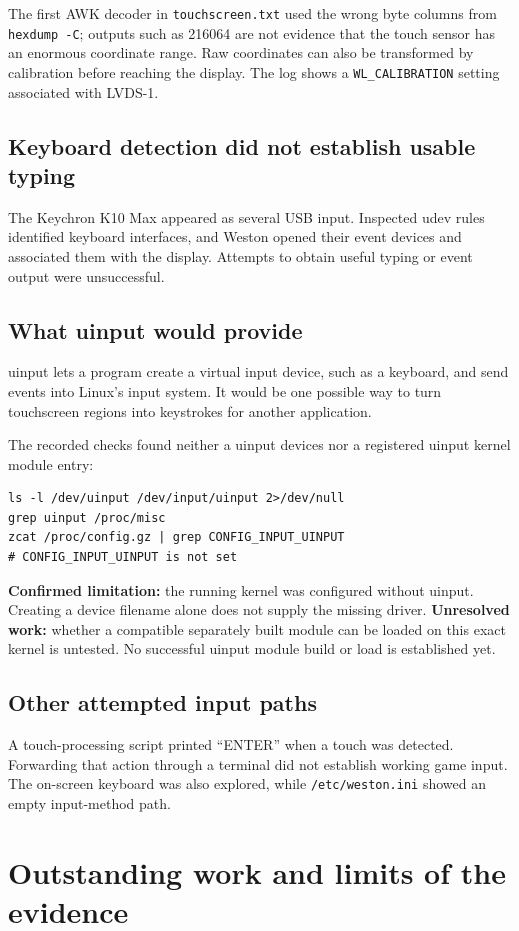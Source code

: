 \documentclass[10pt,letterpaper]{article}
\newcommand{\file}[1]{\nolinkurl{#1}}
\begin{document}
The first AWK decoder in \file{touchscreen.txt} used the wrong byte columns
from \file{hexdump -C}; outputs such as 216064 are not evidence that the touch
sensor has an enormous coordinate range. Raw coordinates can also be transformed
by calibration before reaching the display. The log shows a
\file{WL_CALIBRATION} setting associated with LVDS-1.

\subsection{Keyboard detection did not establish usable typing}
The Keychron K10 Max appeared as several USB input. Inspected udev
rules identified keyboard interfaces, and Weston opened their event
devices and associated them with the display. Attempts to obtain useful typing
or event output were unsuccessful.


\subsection{What uinput would provide}
uinput lets a program create a virtual input device, such as a keyboard, and
send events into Linux's input system. It would be one possible way to turn
touchscreen regions into keystrokes for another application.

The recorded checks found neither a uinput devices nor a registered uinput kernel module entry:
\begin{lstlisting}
ls -l /dev/uinput /dev/input/uinput 2>/dev/null
grep uinput /proc/misc
zcat /proc/config.gz | grep CONFIG_INPUT_UINPUT
# CONFIG_INPUT_UINPUT is not set
\end{lstlisting}
\textbf{Confirmed limitation:} the running kernel was configured without
uinput. Creating a device filename alone does not supply the missing driver.
\textbf{Unresolved work:} whether a compatible separately built module can be
loaded on this exact kernel is untested. No successful uinput module build or load is
established yet.

\subsection{Other attempted input paths}
A touch-processing script printed ``ENTER'' when a touch was detected.
Forwarding that action through a terminal did not
establish working game input. The on-screen keyboard was also explored, while
\file{/etc/weston.ini} showed an empty input-method path. 
\newpage
\section{Outstanding work and limits of the evidence}\label{open}
\end{document}
